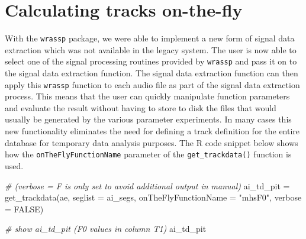 \documentclass[
]{book}
\newenvironment{Shaded}{\begin{snugshade}}{\end{snugshade}}
\newcommand{\AttributeTok}[1]{\textcolor[rgb]{0.77,0.63,0.00}{#1}}
\newcommand{\CommentTok}[1]{\textcolor[rgb]{0.56,0.35,0.01}{\textit{#1}}}
\newcommand{\ConstantTok}[1]{\textcolor[rgb]{0.00,0.00,0.00}{#1}}
\newcommand{\FunctionTok}[1]{\textcolor[rgb]{0.00,0.00,0.00}{#1}}
\newcommand{\NormalTok}[1]{#1}
\newcommand{\OtherTok}[1]{\textcolor[rgb]{0.56,0.35,0.01}{#1}}
\newcommand{\StringTok}[1]{\textcolor[rgb]{0.31,0.60,0.02}{#1}}
\begin{document}
\hypertarget{calculating-tracks-on-the-fly}{%
\section{Calculating tracks on-the-fly}\label{calculating-tracks-on-the-fly}}

With the \texttt{wrassp} package, we were able to implement a new form of signal data extraction which was not available in the legacy system. The user is now able to select one of the signal processing routines provided by \texttt{wrassp} and pass it on to the signal data extraction function. The signal data extraction function can then apply this \texttt{wrassp} function to each audio file as part of the signal data extraction process. This means that the user can quickly manipulate function parameters and evaluate the result without having to store to disk the files that would usually be generated by the various parameter experiments. In many cases this new functionality eliminates the need for defining a track definition for the entire database for temporary data analysis purposes. The R code snippet below shows how the \texttt{onTheFlyFunctionName} parameter of the \texttt{get\_trackdata()} function is used.

\begin{Shaded}
\begin{Highlighting}[]
\CommentTok{\# (verbose = F is only set to avoid additional output in manual)}
\NormalTok{ai\_td\_pit }\OtherTok{=} \FunctionTok{get\_trackdata}\NormalTok{(ae,}
                          \AttributeTok{seglist =}\NormalTok{ ai\_segs,}
                          \AttributeTok{onTheFlyFunctionName =} \StringTok{"mhsF0"}\NormalTok{,}
                          \AttributeTok{verbose =} \ConstantTok{FALSE}\NormalTok{)}

\CommentTok{\# show ai\_td\_pit (F0 values in column T1)}
\NormalTok{ai\_td\_pit}
\end{Highlighting}
\end{Shaded}
\end{document}
